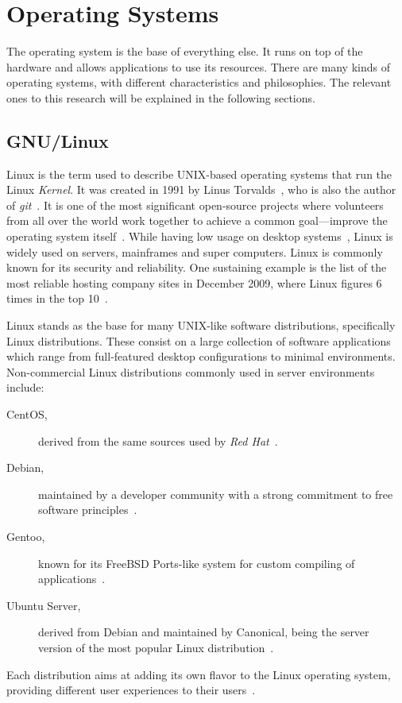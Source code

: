 \section{Operating Systems}
\label{tech:sec:operating_systems}
The operating system is the base of everything else. It runs on top of the hardware and allows applications to use its resources. There are many kinds of operating systems, with different characteristics and philosophies. The relevant ones to this research will be explained in the following sections.

\subsection{GNU/Linux}
Linux is the term used to describe UNIX-based operating systems that run the Linux \textit{Kernel}. It was created in 1991 by Linus Torvalds~\cite{linux_kernel_evolution}, who is also the author of \textit{git}~\cite{pro_git}. It is one of the most significant open-source projects where volunteers from all over the world work together to achieve a common goal---improve the operating system itself~\cite{linux_kernel_evolution}. While having low usage on desktop systems~\cite{w3counter}, Linux is widely used on servers, mainframes and super computers. Linux is commonly known for its security and reliability. One sustaining example is the list of the most reliable hosting company sites in December 2009, where Linux figures 6 times in the top 10~\cite{netcraft_dec2009}.

Linux stands as the base for many UNIX-like software distributions, specifically Linux distributions. These consist on a large collection of software applications which range from full-featured desktop configurations to minimal environments. Non-commercial Linux distributions commonly used in server environments include:
\begin {description}
\item[CentOS,] derived from the same sources used by \textit{Red Hat}~\cite{centos}.
\item[Debian,] maintained by a developer community with a strong commitment to free software principles~\cite{debian}.
\item[Gentoo,] known for its FreeBSD Ports-like system for custom compiling of applications~\cite{gentoo}.
\item[Ubuntu Server,] derived from Debian and maintained by Canonical, being the server version of the most popular Linux distribution~\cite{ubuntu_server}.
\end{description}
Each distribution aims at adding its own flavor to the Linux operating system, providing different user experiences to their users~\cite{tuning_costumizing_linux}.


